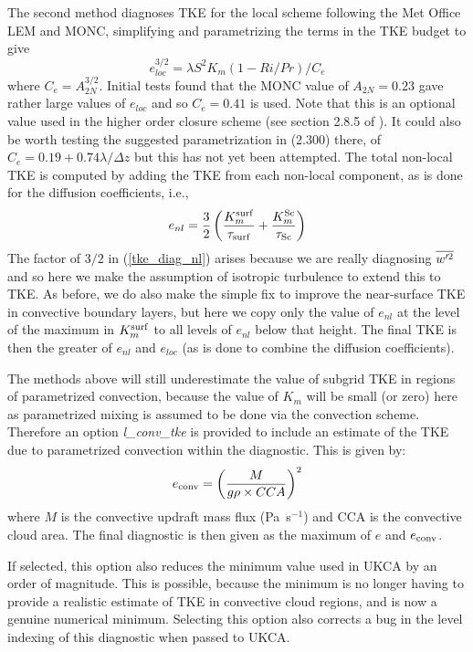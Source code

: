 \documentclass{UMDP_article}
\begin{document}
The second method diagnoses TKE for the local scheme following the Met Office 
LEM and MONC, simplifying and parametrizing the terms in the TKE budget to give
\begin{equation}
  e_{loc}^{3/2} = \lambda S^2 K_m (1-Ri/Pr)/C_{e}
  \label{tke_diag_loc}
\end{equation}
where $C_{e}=A_{2N}^{3/2}$.  Initial tests found that the MONC value of 
$A_{2N}=0.23$ gave rather large values of $e_{loc}$ and so $C_e=0.41$ is used.  Note 
that this is an optional value used in the higher order closure scheme (see section 
2.8.5 of ).  It could also be worth testing the suggested parametrization in 
(2.300) there, of $C_e=0.19+0.74 \lambda/\Delta z$ but this has not yet been attempted.  
The total non-local TKE is computed by adding the TKE from each non-local component, 
as is done for the diffusion coefficients, \mbox{i.e.}, 
\begin{equation}
  e_{nl} = \frac{3}{2} \left( \frac{K_m^{\rm surf}}{\tau_{\rm surf}} 
                           + \frac{K_m^{\rm Sc}}{\tau_{\rm Sc}} \right)
  \label{tke_diag_nl}
\end{equation}
The factor of $3/2$ in (\ref{tke_diag_nl}) arises because we are really diagnosing 
$\overline{w'^2}$ and so here we make the assumption of isotropic turbulence to extend 
this to TKE.  As before, we do also make the simple fix to improve the near-surface 
TKE in convective boundary layers, but here we copy only the value of $e_{nl}$ at the 
level of the maximum in $K_m^{\rm surf}$ to all levels of $e_{nl}$ below that height.  The 
final TKE is then the greater of $e_{nl}$ and $e_{loc}$ (as is done to combine the 
diffusion coefficients).   

The methods above will still underestimate the value of subgrid TKE in
regions of parametrized convection, because the value of $K_m$ will be
small (or zero) here as parametrized mixing is assumed to be done via
the convection scheme. Therefore an option {\sl l\_conv\_tke} is
provided to include an estimate of the TKE due to parametrized
convection within the diagnostic. This is given by:
\begin{equation}
e_{\rm conv} = \left(\frac{M}{g\rho \times CCA}\right)^2
\end{equation}
where $M$ is the convective updraft mass flux (Pa~s$^{-1}$) and CCA is
the convective cloud area. The final diagnostic is then given as the
maximum of $e$ and $e_{\rm conv}$.

If selected, this option also reduces the minimum value used in UKCA
by an order of magnitude. This is possible, because the minimum is no
longer having to provide a realistic estimate of TKE in convective
cloud regions, and is now a genuine numerical minimum. Selecting this
option also corrects a bug in the level indexing of this diagnostic
when passed to UKCA.
\end{document}
